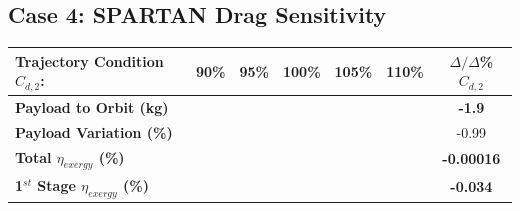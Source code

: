 \subsection{Case 4: SPARTAN Drag Sensitivity}\label{sec:dragvariation}

\begin{table}[ht!]
	\centering
	\begin{tabular}{l c c c c c c} 
		\hline \textbf{Trajectory Condition}   \qquad  $C_{d,2}$: 
		&90\%
		&95\%
		&100\%
		&105\%
		&110\%
		& $\Delta/\Delta$\%$C_{d,2}$
		\\
		\hline \textbf{Payload to Orbit (kg)}
		& \textbf{\PayloadToOrbitCdNinetyNoReturn}
		& \textbf{\PayloadToOrbitCdNinetyFiveNoReturn}
		& \textbf{\PayloadToOrbitCdStandardNoReturn}
		& \textbf{\PayloadToOrbitCdOneHundredFiveNoReturn}
		& \textbf{\PayloadToOrbitCdOneHundredTenNoReturn}
		&\textbf{-1.9}
		\\
		\textbf{Payload Variation (\%)}
		& \PayloadVarCdNinetyNoReturn
		& \PayloadVarCdNinetyFiveNoReturn
		& \PayloadVarCdStandardNoReturn
		& \PayloadVarCdOneHundredFiveNoReturn
		& \PayloadVarCdOneHundredTenNoReturn
		&-0.99
		\\
		\textbf{Total $\eta_{exergy}$ (\%)}
		& \textbf{\totalExergyEffCdNinetyNoReturn}
		& \textbf{\totalExergyEffCdNinetyFiveNoReturn}
		& \textbf{\totalExergyEffCdStandardNoReturn}
		& \textbf{\totalExergyEffCdOneHundredFiveNoReturn}
		& \textbf{\totalExergyEffCdOneHundredTenNoReturn}
		& \textbf{-0.00016}
		\\
		\hline 
		\textbf{1$^{st}$ Stage $\eta_{exergy}$ (\%)}
		& \textbf{\firstExergyEffCdNinetyNoReturn}
		& \textbf{\firstExergyEffCdNinetyFiveNoReturn}
		& \textbf{\firstExergyEffCdStandardNoReturn}
		& \textbf{\firstExergyEffCdOneHundredFiveNoReturn}
		& \textbf{\firstExergyEffCdOneHundredTenNoReturn}
		& \textbf{-0.034}
		\\
	

\end{tabular}
\end{table}
